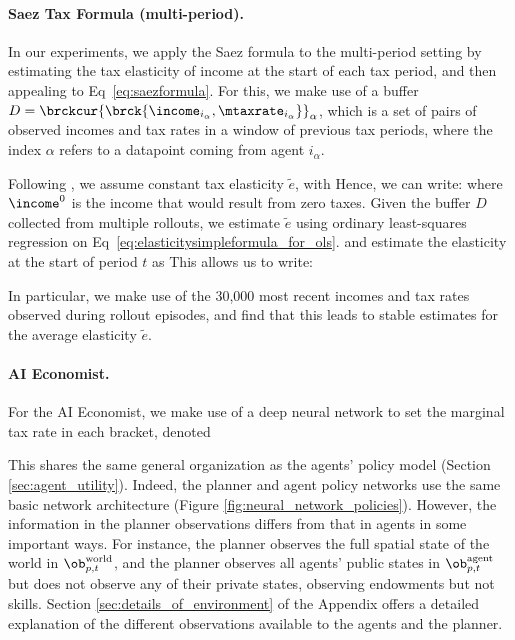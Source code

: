 \paragraph{Saez Tax Formula (multi-period).}
In our experiments, we apply the Saez formula to the multi-period setting by estimating the tax elasticity of income at the start of each tax period, and then appealing to Eq~\ref{eq:saezformula}. For this, we make use of a buffer $D = \brckcur{\brck{\income_{i_\alpha}, \mtaxrate_{i_\alpha}}}_{\alpha}$, which is a set of pairs of observed incomes and tax rates
in a window of previous tax periods, where the index $\alpha$ refers to a datapoint coming from agent $i_\alpha$.

Following \cite{gruber2002elasticity}, we assume constant tax elasticity $\tilde{e}$, with
Hence, we can write:
where $\income^0$ is the income that would result from zero taxes. Given the buffer $D$
collected from multiple rollouts, we estimate $\tilde{e}$ using ordinary least-squares regression on Eq~\ref{eq:elasticitysimpleformula_for_ols}.
and estimate the elasticity at the start of period $t$ as
This allows us to write:

\fi
In particular, we make use of the 30,000 most recent incomes and tax rates observed during rollout episodes, and find that this leads to stable estimates for the average elasticity $\tilde{e}$.



\paragraph{AI Economist.}
For the AI Economist, we make use of a deep neural network to set the marginal tax rate in each bracket, denoted


This shares the same general organization as the agents' policy model (Section \ref{sec:agent_utility}).
Indeed, the planner and agent policy networks use the same basic network architecture (Figure \ref{fig:neural_network_policies}).
However, the information in the planner observations differs from that in agents in some important ways.
For instance, the planner observes the full spatial state of the world in $\ob^\text{world}_{p, t}$, and the planner observes all agents' public states in $\ob^\text{agent}_{p, t}$ but does not observe any of their private states, observing endowments but not skills.
Section \ref{sec:details_of_environment} of the Appendix offers a detailed explanation of the different observations available to the agents and the planner.





